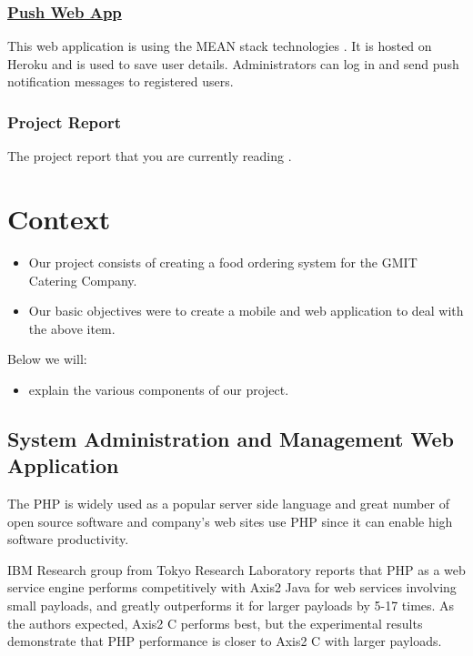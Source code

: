 \subsection*{\href{https://github.com/RonanC/gmitcat-push}{Push Web App}}
This web application is using the MEAN stack technologies \cite{gh_push_webapp}.
It is hosted on Heroku and is used to save user details.
Administrators can log in and send push notification messages to registered users.

\subsection*{Project Report}
The project report that you are currently reading \cite{gh_project_report}.

\chapter{Context}	%

\begin{itemize}
\item Our project consists of creating a food ordering system for the GMIT Catering Company.
\item Our basic objectives were to create a mobile and web application to deal with the above item.
\end{itemize}

Below we will:
\begin{itemize}
\item explain the various components of our project.
\end{itemize}

\section{System Administration and Management Web Application}

The PHP is widely used as a popular server side language and great number of open source software and company’s web sites use PHP since it can enable high software productivity\cite{PHP_Usage}.

IBM Research group from Tokyo Research Laboratory reports that PHP as a web service engine performs competitively with Axis2 Java for web services involving small payloads, and greatly outperforms it for larger payloads by 5-17 times. As the authors expected, Axis2 C performs best, but the experimental results demonstrate that PHP performance is closer to Axis2 C with larger payloads\cite{Web_Service_Engines_in_PHP_Java_C}.

